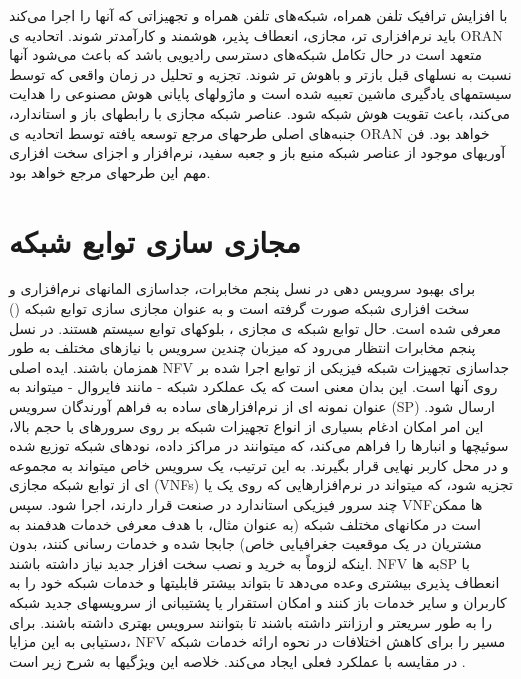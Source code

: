   با افزایش ترافیک تلفن همراه، شبکه‌های تلفن همراه و تجهیزاتی که آنها را اجرا می‌کند باید نرم‌افزاری تر، مجازی، انعطاف پذیر، هوشمند و کارآمدتر شوند.
اتحادیه ی ORAN متعهد است در حال تکامل شبکه‌های دسترسی رادیویی باشد که باعث می‌شود آنها نسبت به نسلهای قبل بازتر و باهوش تر شوند.
تجزیه و تحلیل در زمان واقعی که توسط سیستمهای یادگیری ماشین تعبیه شده است و ماژولهای پایانی هوش مصنوعی را هدایت می‌کند، باعث تقویت هوش شبکه ‌‌شود.
عناصر شبکه مجازی با رابطهای باز و استاندارد، جنبه‌های اصلی طرحهای مرجع توسعه یافته توسط اتحادیه ی ORAN خواهد بود.
فن آوریهای موجود از عناصر شبکه منبع باز و جعبه سفید، نرم‌افزار و اجزای سخت افزاری مهم این طرحهای مرجع خواهد بود.
\section{مجازی سازی توابع شبکه}
برای بهبود سرویس دهی در نسل پنجم مخابرات، جداسازی المانهای نرم‌افزاری و سخت افزاری شبکه صورت گرفته است و به عنوان 
مجازی سازی توابع شبکه () 
معرفی شده است.
  حال توابع شبکه ی مجازی
  ،
  بلوکهای توابع سیستم هستند.
در نسل پنجم مخابرات 
  انتظار می‌رود که
   میزبان چندین سرویس
   با نیازهای مختلف به طور همزمان
    باشند.
    ایده اصلی NFV جداسازی تجهیزات شبکه فیزیکی از توابع اجرا شده بر روی آنها است. این بدان معنی است که یک عملکرد شبکه - مانند فایروال - میتواند به عنوان نمونه ای از نرم‌افزارهای ساده به فراهم آورندگان سرویس (SP)  ارسال شود.
    این امر امکان ادغام بسیاری از انواع تجهیزات شبکه بر روی سرورهای با حجم بالا، سوئیچها و انبارها را فراهم می‌کند، که میتوانند در مراکز داده، نودهای شبکه توزیع شده و در محل کاربر نهایی قرار بگیرند.
    به این ترتیب، یک سرویس خاص میتواند به مجموعه ای از توابع شبکه مجازی (VNFs) تجزیه شود، که میتواند در نرم‌افزارهایی که روی یک یا چند سرور فیزیکی استاندارد در صنعت قرار دارند، اجرا شود.
    سپس VNFها ممکن است در مکانهای مختلف شبکه (به عنوان مثال، با هدف معرفی خدمات هدفمند به مشتریان در یک موقعیت جغرافیایی خاص) جابجا شده و خدمات رسانی کنند، بدون اینکه لزوماً به خرید و نصب سخت افزار جدید نیاز داشته باشند.
    NFV به 
    هاSP
   با انعطاف پذیری بیشتری وعده می‌دهد تا بتواند بیشتر قابلیتها و خدمات شبکه خود را به کاربران و سایر خدمات باز کنند و امکان استقرار یا پشتیبانی از سرویسهای جدید شبکه را  به طور سریعتر و ارزانتر داشته باشند تا بتوانند  سرویس بهتری داشته باشند.
   برای دستیابی به این مزایا، NFV مسیر را برای کاهش اختلافات در نحوه ارائه خدمات شبکه در مقایسه با عملکرد فعلی ایجاد می‌کند. خلاصه این ویژگیها به شرح زیر است
   \cite{NFV}.
